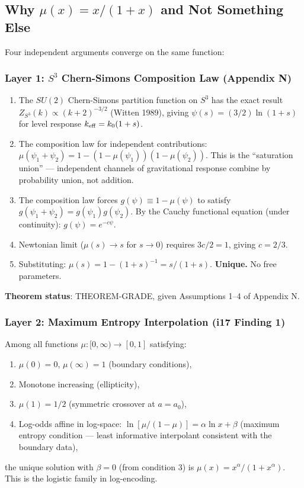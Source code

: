 \documentclass[11pt]{article}
\theoremstyle{definition}
\theoremstyle{remark}
\begin{document}
\subsection{Why $\mu(x) = x/(1+x)$ and Not Something Else}

Four independent arguments converge on the same function:

\subsubsection{Layer 1: $S^3$ Chern-Simons Composition Law (Appendix N)}

\begin{enumerate}
\item The $SU(2)$ Chern-Simons partition function on $S^3$ has the exact
  result $Z_{S^3}(k) \propto (k+2)^{-3/2}$ (Witten 1989), giving
  $\psi(s) = (3/2)\ln(1+s)$ for level response $k_{\rm eff} = k_0(1+s)$.

\item The composition law for independent contributions:
  $\mu(\psi_1 + \psi_2) = 1 - (1-\mu(\psi_1))(1-\mu(\psi_2))$.
  This is the ``saturation union'' --- independent channels of
  gravitational response combine by probability union, not addition.

\item The composition law forces $g(\psi) \equiv 1 - \mu(\psi)$ to satisfy
  $g(\psi_1 + \psi_2) = g(\psi_1)g(\psi_2)$. By the Cauchy
  functional equation (under continuity): $g(\psi) = e^{-c\psi}$.

\item Newtonian limit ($\mu(s) \to s$ for $s \to 0$) requires $3c/2 = 1$,
  giving $c = 2/3$.

\item Substituting: $\mu(s) = 1 - (1+s)^{-1} = s/(1+s)$.
  \textbf{Unique.} No free parameters.
\end{enumerate}

\textbf{Theorem status}: THEOREM-GRADE, given Assumptions 1--4 of Appendix N.

\subsubsection{Layer 2: Maximum Entropy Interpolation (i17 Finding 1)}

Among all functions $\mu: [0,\infty) \to [0,1]$ satisfying:
\begin{enumerate}
\item $\mu(0) = 0$, $\mu(\infty) = 1$ (boundary conditions),
\item Monotone increasing (ellipticity),
\item $\mu(1) = 1/2$ (symmetric crossover at $a = a_0$),
\item Log-odds affine in log-space: $\ln[\mu/(1-\mu)] = \alpha\ln x + \beta$
  (maximum entropy condition --- least informative interpolant
  consistent with the boundary data),
\end{enumerate}
the unique solution with $\beta = 0$ (from condition 3) is
$\mu(x) = x^\alpha/(1+x^\alpha)$. This is the logistic family
in log-encoding.
\end{document}

